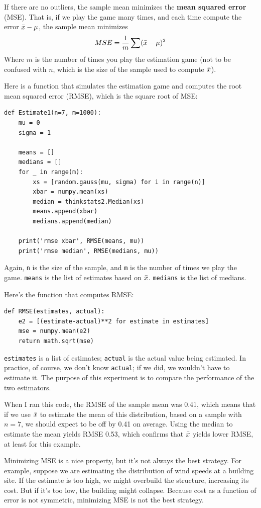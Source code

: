 \documentclass[12pt]{book}
\begin{document}
If there are no outliers, the sample mean minimizes the {\bf mean squared
error} (MSE).  That is, if we play the game many times, and each time
compute the error $\bar{x} - \mu$, the sample mean minimizes
%
\[ MSE = \frac{1}{m} \sum (\bar{x} - \mu)^2 \]
%
Where $m$ is the number of times you play the estimation game (not to
be confused with $n$, which is the size of the sample used to compute
$\bar{x}$).

Here is a function that simulates the estimation game and computes
the root mean squared error (RMSE), which is the square root of
MSE:

\begin{verbatim}
def Estimate1(n=7, m=1000):
    mu = 0
    sigma = 1

    means = []
    medians = []
    for _ in range(m):
        xs = [random.gauss(mu, sigma) for i in range(n)]
        xbar = numpy.mean(xs)
        median = thinkstats2.Median(xs)
        means.append(xbar)
        medians.append(median)

    print('rmse xbar', RMSE(means, mu))
    print('rmse median', RMSE(medians, mu))
\end{verbatim}

Again, {\tt n} is the size of the sample, and {\tt m} is the
number of times we play the game.  {\tt means} is the list of
estimates based on $\bar{x}$.  {\tt medians} is the list of medians.

Here's the function that computes RMSE:

\begin{verbatim}
def RMSE(estimates, actual):
    e2 = [(estimate-actual)**2 for estimate in estimates]
    mse = numpy.mean(e2)
    return math.sqrt(mse)
\end{verbatim}

{\tt estimates} is a list of estimates; {\tt actual} is the
actual value being estimated.  In practice, of course, we don't
know {\tt actual}; if we did, we wouldn't have to estimate it.
The purpose of this experiment is to compare the performance of
the two estimators.

When I ran this code, the RMSE of the sample mean was 0.41, which
means that if we use $\bar{x}$ to estimate the mean of this
distribution, based on a sample with $n=7$, we should expect to be off
by 0.41 on average.  Using the median to estimate the mean yields
RMSE 0.53, which confirms that $\bar{x}$ yields lower RMSE, at least
for this example.

Minimizing MSE is a nice property, but it's not always the best
strategy.  For example, suppose we are estimating the distribution of
wind speeds at a building site.  If the estimate is too high, we might
overbuild the structure, increasing its cost.  But if it's too
low, the building might collapse.  Because cost as a function of
error is not symmetric, minimizing MSE is not the best strategy.
\end{document}
